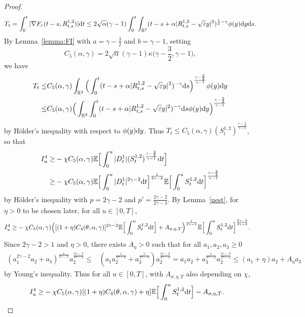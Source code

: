 \documentclass[11pt]{article}
\newcommand{\E}{\mathbb{E}}
\newcommand{\R}{\mathbb{R}}
\newcommand{\1}{\mathbbm{1}}
\newcommand{\dd}{{\rm d}}
\newcommand{\e}{\varepsilon}
\begin{document}
\begin{proof}
$$T_t=\int_0^t  |\nabla F_\e(t-s, R_{t,s}^{1,2})| \dd t \leq 
2\sqrt{\alpha}(\gamma-1)\int_0^t \int_{\R^2}(t-s+\alpha| R^{1,2}_{t,s}-\sqrt \e y|^2)^{\frac12-\gamma} \phi(y)\dd y\dd s.
$$
By Lemma~\ref{lemma:FI} with $a=\gamma-\frac 32 $ and $b=\gamma-1$,
setting 
\begin{equation}
C_5(\alpha,\gamma)=2\sqrt{\alpha}(\gamma-1)\kappa\Big(\gamma-\frac32,\gamma-1\Big),\label{estTu}
\end{equation}
we have 
\begin{align*}
T_t\leq& C_5(\alpha,\gamma) \int_{\R^2}\Big(\int_0^t (t-s+\alpha| R^{1,2}_{t,s}-\sqrt \e y|^2)^{-\gamma}\dd s\Big)^{\frac{\gamma-\frac 32}{\gamma-1}} \phi(y)\dd y
\\
\leq & C_5(\alpha,\gamma) \Big(\int_{\R^2}\int_0^t (t-s+\alpha| R^{1,2}_{t,s}-\sqrt \e y|^2)^{-\gamma}\dd s\phi(y)\dd y\Big)^{\frac{\gamma-\frac 32}{\gamma-1}} 
\end{align*}
by Hölder's inequality with respect to $\phi(y)\dd y$. Thus $T_t\leq C_5(\alpha,\gamma) (S^{1,2}_t)^{\frac{\gamma-\frac 32}{\gamma-1}}$, so that
\begin{align*}
I^4_u \geq& - \chi C_5(\alpha,\gamma) \E \Big[\int_0^u  |D^{1}_t| (S^{1,2}_t)^ {\frac{\gamma-\frac 32}{\gamma-1}}\dd t\Big]\\
\geq& - \chi C_5(\alpha,\gamma) \E \Big[\int_0^u  |D^{1}_t|^{2\gamma-2}\dd t\Big]^{\frac1{2\gamma-2}}
\E\Big[\int_0^u S^{1,2}_t\dd t\Big]^{\frac{\gamma-\frac 32}{\gamma-1}}
\end{align*}
by Hölder's inequality with  $p=2\gamma-2$ and $p'=\frac{2\gamma-2}{2\gamma-3}$.
By Lemma~\ref{nest}, for $\eta>0$ to be chosen later, for all $u \in [0,T]$,
\begin{align*}
I^4_u \geq& - \chi C_5(\alpha,\gamma)\Big([(1+\eta)C_4(\theta,\alpha,\gamma)]^{2\gamma-2}
\E\Big[\int_0^u S^{1,2}_t\dd t\Big]+A_{\sigma,\eta,T}\Big) ^{\frac1{2\gamma-2}}
\E\Big[\int_0^u S^{1,2}_t\dd t\Big]^{\frac{2\gamma-3}{2\gamma-2}}.
\end{align*}
Since $2\gamma-2>1$ and $\eta>0$, there exists $A_{\eta}>0$ such that for all $a_1,a_2,a_3 \geq0$
\begin{align*}
(a_1^{2\gamma-2}a_2+a_3)^{\frac1{2\gamma-2}}a_2^{\frac{2\gamma-3}{2\gamma-2}} \leq & (a_1a_2^{\frac1{2\gamma-2}}
+a_3^{\frac1{2\gamma-2}}) a_2^{\frac{2\gamma-3}{2\gamma-2}}
= a_1a_2 +a_3^{\frac1{2\gamma-2}}a_2^{\frac{2\gamma-3}{2\gamma-2}}
\leq (a_1+\eta) a_2 + A_{\eta} a_3
\end{align*}
by Young's inequality. Thus for all $u \in [0,T]$, with $A_{\sigma,\eta,T}$ also depending on $\chi$,
\begin{align}
I^4_u\geq& - \chi C_5(\alpha,\gamma)[(1+\eta)C_4(\theta,\alpha,\gamma)+\eta]
\E \Big[\int_0^u   S^{1,2}_t\dd t\Big] - A_{\sigma,\eta,T}.
\label{eq:d}
\end{align}


\end{proof}
\end{document}
